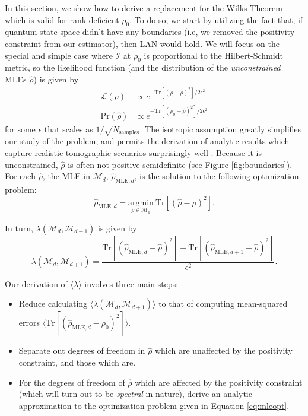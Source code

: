 \documentclass[aps,pra, twocolumn]{revtex4-1}
\newcommand{\M}{\mathcal{M}}
\newcommand{\cL}{\mathcal{L}}
\newcommand{\Fi}{\mathcal{I}}
\newcommand{\rhohat}{\hat{\rho}}
\begin{document}
In this section, we show how to derive a replacement for the Wilks Theorem which is valid for rank-deficient $\rho_{0}$. 
To do so, we start by utilizing the fact that, if quantum state space didn't have any boundaries (i.e, we removed the positivity constraint from our estimator), then LAN would hold. We will focus on the special and simple case where $\Fi$ at $\rho_{0}$ is  proportional to the Hilbert-Schmidt metric, so the likelihood function (and the distribution of the \emph{unconstrained} MLEs $\rhohat$) is given by 
\begin{align}
\label{eq:likelihood}
\cL(\rho) & \propto e^{-\mathrm{Tr}[(\rho - \rhohat)^{2}]/2\epsilon^{2}}\\
\mathrm{Pr}(\rhohat) &\propto e^{-\mathrm{Tr}[(\rho_{0} - \rhohat)^{2}]/2\epsilon^{2}}
\end{align}
for some $\epsilon$ that scales as $1 / \sqrt{N_{\mathrm{samples}}}$.  The isotropic assumption greatly simplifies our study of the problem, and permits the derivation of analytic results which capture realistic tomographic scenarios surprisingly well \cite{Smolin2012}. 
Because it is unconstrained, $\rhohat$ is often not positive semidefinite (see Figure \ref{fig:boundaries}). For each $\rhohat$, the MLE in $\M_{d}$, $\hat{\rho}_{\mathrm{MLE},d}$, is the solution to the following optimization problem:
\begin{equation}
\label{eq:mleopt}
\hat{\rho}_{\mathrm{MLE}, d} = \underset{\rho \in \M_{d}}{\mathrm{argmin}}~\mathrm{Tr}[(\rhohat - \rho)^{2}].
\end{equation}

In turn, $\lambda(\M_{d}, \M_{d+1})$ is given by
\begin{equation}
\label{eq:llrs}
\lambda(\M_{d}, \M_{d+1}) = \frac{\mathrm{Tr}[(\hat{\rho}_{\mathrm{MLE}, d}  - \rhohat)^{2}] - \mathrm{Tr}[(\hat{\rho}_{\mathrm{MLE}, d+1} - \rhohat)^{2}]}{\epsilon^{2}}.
\end{equation}

Our derivation of $\langle \lambda \rangle$ involves three main steps:
\begin{itemize}
\item Reduce calculating $\langle \lambda(\M_{d}, \M_{d+1})\rangle$ to that of computing mean-squared errors $\langle \mathrm{Tr}[(\hat{\rho}_{\mathrm{MLE},d} - \rho_{0})^{2}]\rangle$.
\item Separate out degrees of freedom in $\rhohat$ which are unaffected by the positivity constraint, and those which are.
\item For the degrees of freedom of $\rhohat$ which are affected by the positivity constraint (which will turn out to be \emph{spectral} in nature), derive an analytic approximation to the optimization problem given in Equation \eqref{eq:mleopt}.
\end{itemize}
\end{document}
